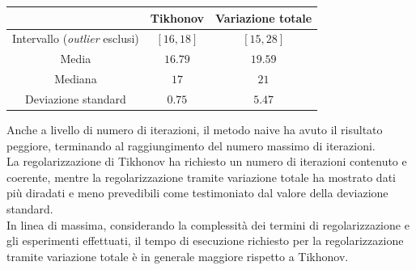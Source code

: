 \documentclass[11pt]{article}
\begin{document}
\begin{center}
    \begin{tabular}{ |c|c|c| }
    \hline
    & Tikhonov & Variazione totale \\ 
    \hline
    Intervallo (\emph{outlier} esclusi) & $[16, 18]$ & $[15, 28]$ \\
    Media & $16.79$ & $19.59$ \\
    Mediana & $17$ & $21$ \\
    Deviazione standard & $0.75$ & $5.47$ \\
    \hline
    \end{tabular}
\end{center}
Anche a livello di numero di iterazioni, il metodo naive ha avuto il risultato peggiore, terminando al raggiungimento del numero massimo di iterazioni.\\
La regolarizzazione di Tikhonov ha richiesto un numero di iterazioni contenuto e coerente, mentre la regolarizzazione tramite variazione totale ha mostrato dati più diradati e meno prevedibili come testimoniato dal valore della deviazione standard.\\
In linea di massima, considerando la complessità dei termini di regolarizzazione e gli esperimenti effettuati, il tempo di esecuzione richiesto per la regolarizzazione tramite variazione totale è in generale maggiore rispetto a Tikhonov.

\newpage
\end{document}

